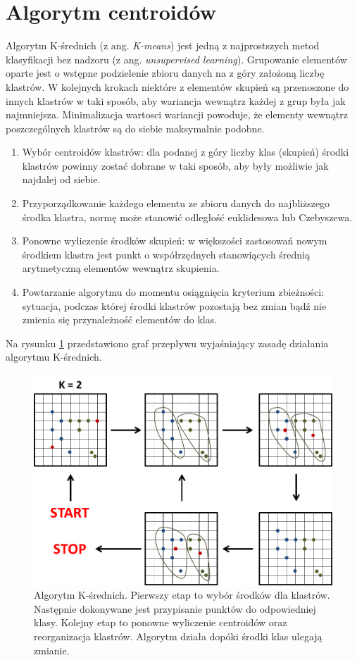 \section{Algorytm centroidów}
Algorytm K-średnich (z ang. \textit{K-means}) jest jedną z najprostszych metod klasyfikacji bez nadzoru (z ang. \textit{unsupervised learning}). Grupowanie elementów oparte jest o wstępne podzielenie zbioru danych na z góry założoną liczbę klastrów. W kolejnych krokach niektóre z elementów skupień są przenoszone do innych klastrów w taki sposób, aby wariancja wewnątrz każdej z grup była jak najmniejsza. Minimalizacja wartosci wariancji powoduje, że elementy wewnątrz poszczególnych klastrów są do siebie maksymalnie podobne. 

\begin{enumerate}
	\item Wybór centroidów klastrów: dla podanej z góry liczby klas (skupień)  środki klastrów powinny zostać dobrane w taki sposób, aby były możliwie jak najdalej od siebie.
	\item Przyporządkowanie każdego elementu ze zbioru danych do najbliższego środka klastra, normę może stanowić odległość euklidesowa lub Czebyszewa.
	\item Ponowne wyliczenie środków skupień: w większości zastosowań nowym środkiem klastra jest punkt o współrzędnych stanowiących średnią arytmetyczną elementów wewnątrz skupienia.
	\item Powtarzanie algorytmu do momentu osiągnięcia kryterium zbieżności: sytuacja, podczas której środki klastrów pozostają bez zmian bądź nie zmienia się przynależność elementów do klas.
\end{enumerate}

Na rysunku \ref{im: Clustering} przedstawiono graf przepływu wyjaśniający zasadę działania algorytmu K-średnich.
 \begin{figure}[h]
	\includegraphics[width=16cm]{Clustering1}
	\centering
	\caption{Algorytm K-średnich. Pierwszy etap to wybór środków dla klastrów. Następnie dokonywane jest przypisanie punktów do odpowiedniej klasy. Kolejny etap to ponowne wyliczenie centroidów oraz reorganizacja klastrów. Algorytm działa dopóki środki klas ulegają zmianie.}
	\label{im: Clustering}
\end{figure}


